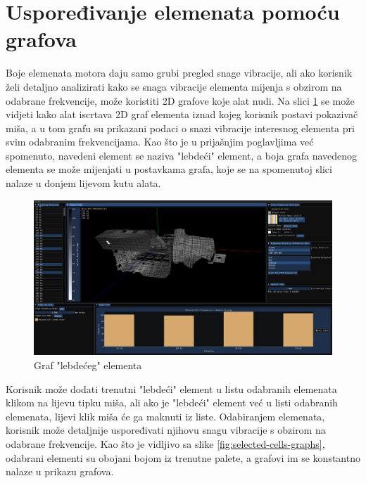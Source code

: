 \documentclass[times, utf8, diplomski]{fer}
\begin{document}
\section{Uspoređivanje elemenata pomoću grafova}

Boje elemenata motora daju samo grubi pregled snage vibracije, ali ako korisnik želi detaljno analizirati kako se snaga vibracije elementa mijenja s obzirom na odabrane frekvencije, može koristiti 2D grafove koje alat nudi. Na slici \ref{fig:hovered-graph} se može vidjeti kako alat iscrtava 2D graf elementa iznad kojeg korisnik postavi pokazivač miša, a u tom grafu su prikazani podaci o snazi vibracije interesnog elementa pri svim odabranim frekvencijama. Kao što je u prijašnjim poglavljima već spomenuto, navedeni element se naziva "lebdeći" element, a boja grafa navedenog elementa se može mijenjati u postavkama grafa, koje se na spomenutoj slici nalaze u donjem lijevom kutu alata.

\begin{figure} [H]
	\centering
    \includegraphics[width=\textwidth]{demonstration/cell_hovered.png}
    \caption{Graf "lebdećeg" elementa}
    \label{fig:hovered-graph}
\end{figure}

Korisnik može dodati trenutni "lebdeći" element u listu odabranih elemenata klikom na lijevu tipku miša, ali ako je "lebdeći" element već u listi odabranih elemenata, lijevi klik miša će ga maknuti iz liste. Odabiranjem elemenata, korisnik može detaljnije uspoređivati njihovu snagu vibracije s obzirom na odabrane frekvencije. Kao što je vidljivo sa slike \ref{fig:selected-cells-graphs}, odabrani elementi su obojani bojom iz trenutne palete, a grafovi im se konstantno nalaze u prikazu grafova. 
\end{document}
